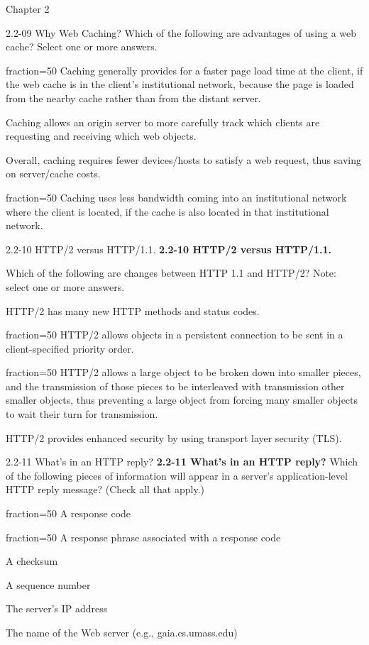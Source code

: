 \documentclass[11pt]{article}
\begin{document}
\begin{quiz}{Chapter 2}
\begin{multi}[points=1,shuffle,multiple]{2.2-09 Why Web Caching?}
Which of the following are advantages of using a web cache? Select one or more answers.

\item[fraction=50] Caching generally provides for a faster page load time at the client, if the web cache is in the client's institutional network, because the page is loaded from the nearby cache rather than from the distant server.
\item Caching allows an origin server to more carefully track which clients are requesting and receiving which web objects.
\item Overall, caching requires fewer devices/hosts to satisfy a web request, thus saving on server/cache costs.
\item[fraction=50] Caching uses less bandwidth coming into an institutional network where the client is located, if the cache is also located in that institutional network.
\end{multi}

\begin{multi}[points=1,shuffle,multiple]{2.2-10 HTTP/2 versus HTTP/1.1.}
\textbf{2.2-10 HTTP/2 versus HTTP/1.1.}  

Which of the following are changes between HTTP 1.1 and HTTP/2? Note: select one or more answers.
\item HTTP/2 has many new HTTP methods and status codes.
\item[fraction=50] HTTP/2 allows objects in a persistent connection to be sent in a client-specified priority order. 
\item[fraction=50] HTTP/2 allows a large object to be broken down into smaller pieces, and the transmission of those pieces to be interleaved with transmission other smaller objects, thus preventing a large object from forcing many smaller objects to wait their turn for transmission.
\item HTTP/2 provides enhanced security by using transport layer security (TLS).
\end{multi}

\begin{multi}[points=1,shuffle,multiple]{2.2-11 What's in an HTTP reply?}
\textbf{2.2-11 What's in an HTTP reply?} 
Which of the following pieces of information will appear in a server's application-level HTTP reply message? (Check all that apply.)
\item[fraction=50] A response code
\item[fraction=50] A response phrase associated with a response code
\item A checksum
\item A sequence number
\item The server's IP address
\item The name of the Web server (e.g., gaia.cs.umass.edu)
\end{multi}


\end{quiz}
\end{document}
